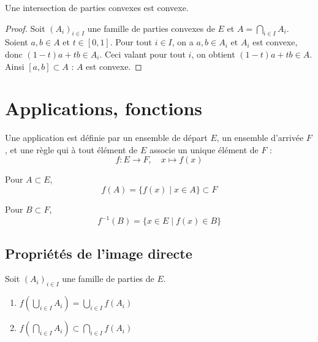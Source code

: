 \begin{prop}
\label{prop:inter-convexes}
Une intersection de parties convexes est convexe.
\end{prop}

\begin{proof}
Soit $(A_i)_{i\in I}$ une famille de parties convexes de $E$ et $A=\displaystyle\bigcap_{i\in I}A_i$. Soient $a,b\in A$ et $t\in[0,1]$. Pour tout $i\in I$, on a $a,b\in A_i$ et $A_i$ est convexe, donc $(1-t)a+tb\in A_i$. Ceci valant pour tout $i$, on obtient $(1-t)a+tb\in A$. Ainsi $[a,b]\subset A$ : $A$ est convexe.
\end{proof}

\section{Applications, fonctions}

Une application est définie par un ensemble de départ $E$, un ensemble d'arrivée $F$, et une règle qui à tout élément de $E$ associe un unique élément de $F$ :
\[f : E \to F, \quad x \mapsto f(x)\]

\begin{defi}
Pour $A\subset E$,
\[f(A) = \{f(x) \mid x\in A\} \subset F\]
\end{defi}

\begin{defi}
Pour $B\subset F$,
\[f^{-1}(B) = \{x\in E \mid f(x)\in B\}\]
\end{defi}

\subsection{Propriétés de l'image directe}

\begin{prop}
\label{prop:image-directe}
Soit $(A_i)_{i\in I}$ une famille de parties de $E$.
\begin{enumerate}
\item[i)] $f\left(\displaystyle\bigcup_{i\in I} A_i\right) = \displaystyle\bigcup_{i\in I} f(A_i)$
\item[ii)] $f\left(\displaystyle\bigcap_{i\in I} A_i\right) \subset \displaystyle\bigcap_{i\in I} f(A_i)$
\end{enumerate}
\end{prop}


